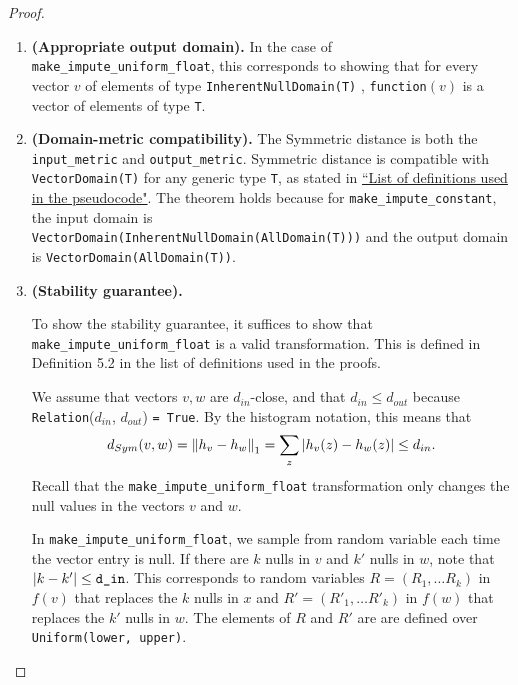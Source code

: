 \documentclass[11pt,a4paper]{article}
\newcommand{\grace}[1]{{ {\color{purple}{(grace)~#1}}}}
\newcommand{\din}{\texttt{d\_in}}
\begin{document}
\begin{proof}
\begin{enumerate}
    \item \textbf{(Appropriate output domain).} In the case of \texttt{make\_impute\_uniform\_float}, this corresponds to showing that for every vector $v$ of elements of type \texttt{InherentNullDomain(T)} \grace{T? or InherentNullDomain???}, \texttt{function}$(v)$ is a vector of elements of type \texttt{T}. 
    
    \grace{TODO We show the type signature + nullity works}
    
    \item \textbf{(Domain-metric compatibility).} The Symmetric distance is both the \texttt{input\_metric} and \texttt{output\_metric}. Symmetric distance is compatible with \texttt{VectorDomain(T)} for any generic type \texttt{T}, as stated in \href{https://www.overleaf.com/project/60d215bf90b337ac02200a99}{``List of definitions used in the pseudocode"}. The theorem holds because for \texttt{make\_impute\_constant}, the input domain is \\ \texttt{VectorDomain(InherentNullDomain(AllDomain(T)))} and the output domain is \texttt{VectorDomain(AllDomain(T))}. 
    
    
    
    \item \textbf{(Stability guarantee).}
    
    To show the stability guarantee, it suffices to show that \texttt{make\_impute\_uniform\_float} is a valid transformation. This is defined in Definition 5.2 in the list of definitions used in the proofs. 
    
    We assume that vectors $v, w$ are $d_{in}$-close, and that $d_{in} \leq d_{out}$ because \texttt{Relation}($d_{in}$, $d_{out}$) \texttt{= True}. By the histogram notation, this means that $$d_{Sym}(v, w) = \norm{h_v - h_w}_1 = \sum_{z} \abs{h_v(z) - h_w(z)} \leq d_{in}.$$ Recall that the \texttt{make\_impute\_uniform\_float} transformation only changes the null values in the vectors $v$ and $w$. 
    
    In \texttt{make\_impute\_uniform\_float}, we sample from random variable each time the vector entry is null. If there are $k$ nulls in $v$ and $k'$ nulls in $w$, note that $\abs{k - k'} \leq \din$. This corresponds to random variables $R = (R_1, \ldots R_k)$ in $f(v)$ that replaces the $k$ nulls in $x$ and $R' = (R'_1, \ldots R'_k)$ in $f(w)$ that replaces the $k'$ nulls in $w$. The elements of $R$ and $R'$ are are defined over \texttt{Uniform(lower, upper)}.


\end{enumerate}
\end{proof}
\end{document}
